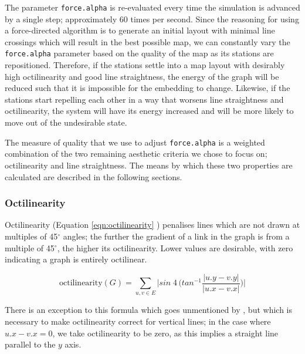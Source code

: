 The parameter \texttt{force.alpha} is re-evaluated every time the simulation is advanced by a single step; approximately 60 times per second. Since the reasoning for using a force-directed algorithm is to generate an initial layout with minimal line crossings which will result in the best possible map, we can constantly vary the \texttt{force.alpha} parameter based on the quality of the map as its stations are repositioned. Therefore, if the stations settle into a map layout with desirably high octilinearity and good line straightness, the energy of the graph will be reduced such that it is impossible for the embedding to change. Likewise, if the stations start repelling each other in a way that worsens line straightness and octilinearity, the system will have its energy increased and will be more likely to move out of the undesirable state.

The measure of quality that we use to adjust \texttt{force.alpha} is a weighted combination of the two remaining aesthetic criteria we chose to focus on; octilinearity and line straightness. The means by which these two properties are calculated are described in the following sections.

\subsubsection{Octilinearity}

Octilinearity (Equation \ref{eqn:octilinearity} \citep{AutomaticMetroMapLayoutThesis}) penalises lines which are not drawn at multiples of 45$^{\circ}$ angles; the further the gradient of a link in the graph is from a multiple of 45$^{\circ}$, the higher its octilinearity. Lower values are desirable, with zero indicating a graph is entirely octilinear. 

\begin{equation}
	\text{octilinearity}(G) = \sum_{u, v\in E}\bigg|sin\;4\,\bigg(tan^{-1}\frac{|u.y - v.y|}{|u.x - v.x|}\bigg)\bigg|
\label{eqn:octilinearity}
\end{equation}

There is an exception to this formula which goes unmentioned by \citeauthor{AutomaticMetroMapLayoutThesis}, but which is necessary to make octilinearity correct for vertical lines; in the case where $u.x - v.x = 0$, we take octilinearity to be zero, as this implies a straight line parallel to the $y$ axis.\\

